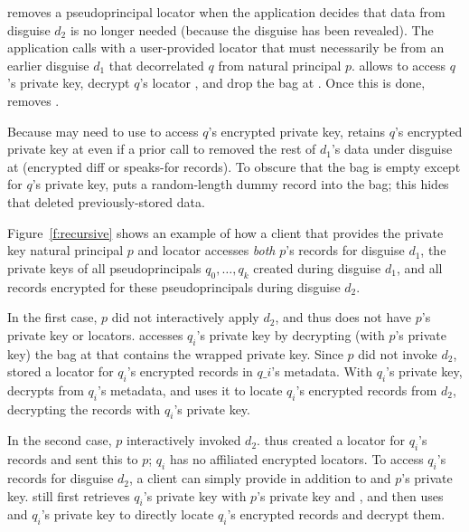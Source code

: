 %
\sys removes a pseudoprincipal locator  when the application
decides that data from disguise $d_2$ is no longer needed (\eg because
the disguise has been revealed).
%
The application calls  with a
user-provided locator that must necessarily be from an earlier disguise
$d_1$ that decorrelated $q$ from natural principal $p$.
%
 allows \sys to access $q$'s private key, decrypt $q$'s locator
, and drop the bag at .
%
Once this is done, \sys removes .
%

%
Because \sys may need to use  to access $q$'s encrypted private key,
\sys retains $q$'s encrypted private key at  even if a prior call to
 removed the rest of $d_1$'s data under
disguise at  (\ie encrypted diff or speaks-for records).
%
To obscure that the bag is empty except for $q$'s private key,
\sys puts a random-length dummy record into the bag; this hides that \sys
deleted previously-stored data.
%
%

%
Figure~\ref{f:recursive} shows an example of how a client that provides
the private key natural principal $p$ and locator  accesses
\emph{both} $p$'s records for disguise $d_1$, the private
keys of all pseudoprincipals ${q_0, \dots, q_k}$ created during disguise
$d_1$, and all records encrypted for these pseudoprincipals during disguise
$d_2$.

%
In the first case, $p$ did not interactively apply $d_2$, and thus \sys does not have $p$'s private
key or locators.
\sys accesses $q_i$'s private key by decrypting (with $p$'s private key) the
bag at  that contains the wrapped private key.
Since $p$ did not invoke $d_2$, \sys stored a locator for $q_i$'s encrypted records
 in $q\_i$'s metadata.
With $q_i$'s private key, \sys decrypts  from $q_i$'s metadata,
and uses it to locate $q_i$'s encrypted records from $d_2$, decrypting the records
with $q_i$'s private key.
%

%
In the second case, $p$ interactively invoked $d_2$. \sys thus created a locator  for
$q_i$'s records and sent this to $p$; $q_i$ has no affiliated encrypted locators. To access $q_i$'s
records for disguise $d_2$, a client can simply provide  in addition to  and
$p$'s private key. \sys still first retrieves $q_i$'s private key with $p$'s private key and
, and then uses  and $q_i$'s private key to directly locate $q_i$'s
encrypted records and decrypt them.
%

